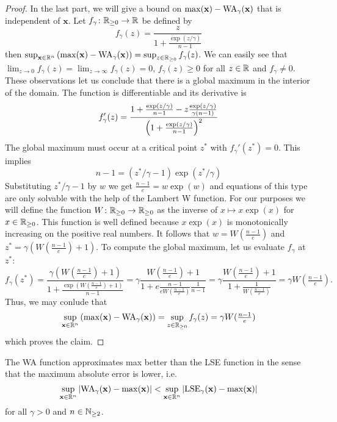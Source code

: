 \begin{proof}
 In the last part, we will give a bound on \(\max(\mathbf{x}) - \operatorname{WA}_\gamma(\mathbf{x})\) that is independent of \(\mathbf{x}\).
 Let \(f_\gamma \colon \mathbb{R}_{\geq 0} \to \mathbb{R}\) be defined by
 \[ f_\gamma(z) = \frac{z}{1 + \frac{\exp(z/\gamma)}{n-1}} \]
 then \(\sup_{\mathbf{x} \in \mathbb{R}^n} \left({ \max(\mathbf{x}) - \operatorname{WA}_\gamma(\mathbf{x}) }\right) = \sup_{z \in \mathbb{R}_{\geq 0}} f_\gamma(z)\).
 We can easily see that \(\lim_{z \to 0} f_\gamma(z) = \lim_{z \to \infty} f_\gamma(z) = 0\), \(f_\gamma(z) \geq 0\) for all \(z \in \mathbb{R}\) 
 and \(f_\gamma \neq 0\).
 These observations let us conclude that there is a global maximum in the interior of the domain.
 The function is differentiable and its derivative is 
 \[ f'_\gamma(z) = \frac{1 + \frac{\exp(z / \gamma)}{n-1} - z \frac{\exp(z/\gamma)}{\gamma (n-1)}}{\left({ 1 + \frac{\exp(z / \gamma)}{n-1} }\right)^2} \]
 The global maximum must occur at a critical point \(z^*\) with \(f_\gamma'(z^*) = 0\). 
 This implies
 \[ n-1 = ( z^* / \gamma - 1) \exp(z^* / \gamma) \]
 Substituting \(z^* / \gamma - 1\) by \(w\) we get \(\frac{n-1}{e} = w \exp(w)\) 
 and equations of this type are only solvable with the help of the Lambert W function.
 For our purposes we will define the function \(W \colon \mathbb{R}_{\geq 0} \to \mathbb{R}_{\geq 0}\) 
 as the inverse of \(x \mapsto x \exp(x)\) for \(x \in \mathbb{R}_{\geq 0}\).
 This function is well defined because \(x \exp(x)\) is monotonically increasing on the positive real numbers.
 It follows that \(w = W(\frac{n-1}{e})\) and \(z^* = \gamma ( W(\frac{n-1}{e}) + 1)\).
 To compute the global maximum, let us evaluate \(f_\gamma\) at \(z^*\):
 \[ f_\gamma(z^*) = \frac{\gamma ( W(\frac{n-1}{e}) + 1)}{1 + \frac{\exp( W(\frac{n-1}{e}) + 1 )}{n-1}} 
                  = \gamma \frac{W(\frac{n-1}{e}) + 1}{1 + e \frac{n-1}{e W(\frac{n-1}{e})} \frac{1}{n-1}}
                  = \gamma \frac{W(\frac{n-1}{e}) + 1}{1 + \frac{1}{ W(\frac{n-1}{e})}}
                  = \gamma W(\tfrac{n-1}{e}). \]
 Thus, we may conlude that
 \[ \sup_{\mathbf{x} \in \mathbb{R}^n} \left({ \max(\mathbf{x}) - \operatorname{WA}_\gamma(\mathbf{x}) }\right) = \sup_{z \in \mathbb{R}_{\geq 0}} f_\gamma(z) = \gamma W(\tfrac{n-1}{e}) \]
 which proves the claim.
\end{proof}


\begin{theorem} \label{thm:WA_approximates_max_better_than_LSE}
 The WA function approximates max better than the LSE function in the sense that the maximum absolute error is lower, i.e.
 \[ \sup_{\mathbf{x} \in \mathbb{R}^n} \left\lvert \operatorname{WA}_\gamma(\mathbf{x}) - \max(\mathbf{x}) \right\rvert < \sup_{\mathbf{x} \in \mathbb{R}^n} \left\lvert \operatorname{LSE}_\gamma(\mathbf{x}) - \max(\mathbf{x}) \right\rvert \]
 for all \(\gamma > 0\) and \(n \in \mathbb{N}_{\geq 2}\).
\end{theorem}

